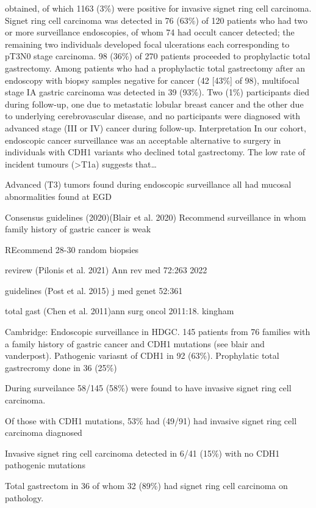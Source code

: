 \documentclass[
  letterpaper,
]{scrbook}
\begin{document}
obtained, of which 1163 (3\%) were positive for invasive signet ring
cell carcinoma. Signet ring cell carcinoma was detected in 76 (63\%) of
120 patients who had two or more surveillance endoscopies, of whom 74
had occult cancer detected; the remaining two individuals developed
focal ulcerations each corresponding to pT3N0 stage carcinoma. 98 (36\%)
of 270 patients proceeded to prophylactic total gastrectomy. Among
patients who had a prophylactic total gastrectomy after an endoscopy
with biopsy samples negative for cancer (42 {[}43\%{]} of 98),
multifocal stage IA gastric carcinoma was detected in 39 (93\%). Two
(1\%) participants died during follow-up, one due to metastatic lobular
breast cancer and the other due to underlying cerebrovascular disease,
and no participants were diagnosed with advanced stage (III or IV)
cancer during follow-up. Interpretation In our cohort, endoscopic cancer
surveillance was an acceptable alternative to surgery in individuals
with CDH1 variants who declined total gastrectomy. The low rate of
incident tumours (\textgreater T1a) suggests that\ldots{}

Advanced (T3) tumors found during endoscopic surveillance all had
mucosal abnormalities found at EGD

Consensus guidelines (2020)(Blair et al. 2020) Recommend surveillance in
whom family history of gastric cancer is weak

REcommend 28-30 random biopsies

revirew (Pilonis et al. 2021) Ann rev med 72:263 2022

guidelines (Post et al. 2015) j med genet 52:361

total gast (Chen et al. 2011)ann surg oncol 2011:18. kingham

Cambridge: Endoscopic surveillance in HDGC. 145 patients from 76
families with a family history of gastric cancer and CDH1 mutations (see
blair and vanderpost). Pathogenic variasnt of CDH1 in 92 (63\%).
Prophylatic total gastrecromy done in 36 (25\%)

During surveilance 58/145 (58\%) were found to have invasive signet ring
cell carcinoma.

Of those with CDH1 mutations, 53\% had (49/91) had invasive signet ring
cell carcinoma diagnosed

Invasive signet ring cell carcinoma detected in 6/41 (15\%) with no CDH1
pathogenic mutations

Total gastrectom in 36 of whom 32 (89\%) had signet ring cell carcinoma
on pathology.
\end{document}
